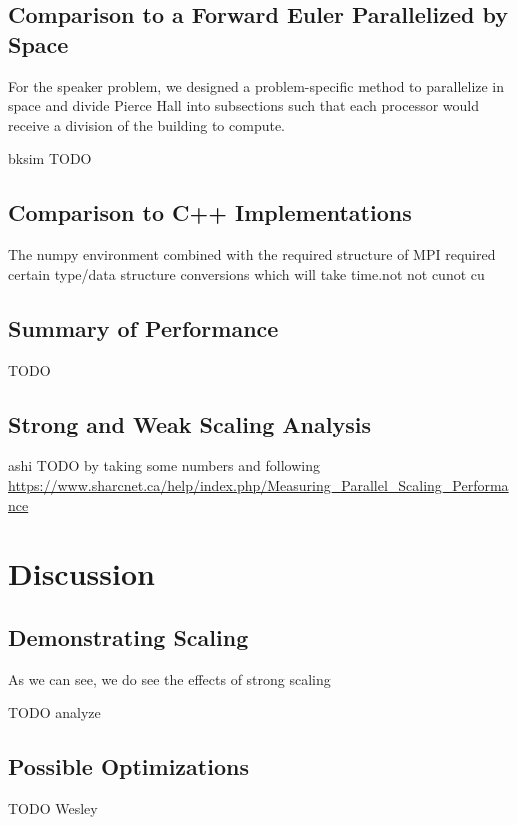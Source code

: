 \documentclass[letterpaper,11pt]{article}
\begin{document}
\subsection{Comparison to a Forward Euler Parallelized by Space}

For the speaker problem, we designed a problem-specific method to parallelize in space and divide Pierce Hall into subsections such that each processor would receive a division of the building to compute.

bksim TODO

\subsection{Comparison to C++ Implementations}

The numpy environment combined with the required structure of MPI required
certain type/data structure conversions which will take time.not not cunot
cu

\subsection{Summary of Performance}

TODO

\subsection{Strong and Weak Scaling Analysis}

ashi TODO by taking some numbers and following
\url{https://www.sharcnet.ca/help/index.php/Measuring_Parallel_Scaling_Performance}

\section{Discussion}

\subsection{Demonstrating Scaling}

As we can see, we do see the effects of strong scaling

TODO analyze


\subsection{Possible Optimizations}

TODO Wesley
\end{document}
